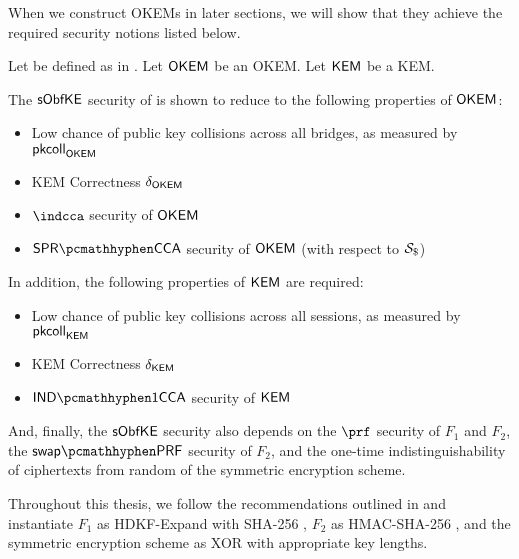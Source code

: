 When we construct OKEMs in later sections, we will show that they achieve the required security notions listed below.

\begin{theorem}
\label{thm:drivel-security}
    Let \drivel{} be defined as in \cite[Fig.~6]{EPRINT:GRSV25}. Let $\mathsf{OKEM}$ be an OKEM. Let $\mathsf{KEM}$ be a KEM.
    
    The $\mathsf{sObfKE}$ security of \drivel{} is shown to reduce to the following properties of $\mathsf{OKEM}$:
    \begin{itemize}
        \item Low chance of public key collisions across all bridges, as measured by $\mathsf{pkcoll}_{\mathsf{OKEM}}$
        \item KEM Correctness $\delta_{\mathsf{OKEM}}$
        \item $\indcca$ security of $\mathsf{OKEM}$
        \item $\sprcca$ security of $\mathsf{OKEM}$ (with respect to $\simulbin$)
    \end{itemize}

    In addition, the following properties of $\mathsf{KEM}$ are required:
    \begin{itemize}
        \item Low chance of public key collisions across all sessions, as measured by $\mathsf{pkcoll}_{\mathsf{KEM}}$
        \item KEM Correctness $\delta_{\mathsf{KEM}}$
        \item $\indonecca$ security of $\mathsf{KEM}$
    \end{itemize}

    And, finally, the $\mathsf{sObfKE}$ security also depends on the $\prf$ security of $F_1$ and $F_2$, the $\swapprf$ security of $F_2$, and the one-time indistinguishability of ciphertexts from random of the symmetric encryption scheme.    
\end{theorem}

Throughout this thesis, we follow the recommendations outlined in \cite[Section~4.2]{EPRINT:GRSV25} and instantiate $F_1$ as \textsf{HDKF-Expand} with \textsf{SHA-256} \cite{C:Krawczyk10,rfc5869}, $F_2$ as \textsf{HMAC-SHA-256} \cite{C:BelCanKra96,KraBelCan97}, and the symmetric encryption scheme as XOR with appropriate key lengths.

